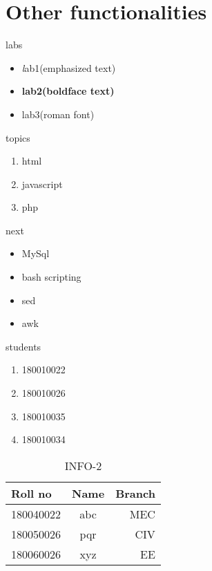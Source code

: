\documentclass{article}
\begin{document}
\section{Other functionalities}
{\large labs}
\begin{itemize}
\item \emph lab1(emphasized text)
\item \textbf {\tiny lab2(boldface text)}\\
\item \textrm {\Large lab3(roman font)}\\
\end{itemize}
{\large topics}
\begin{enumerate}
\item html
\item javascript
\item php
\end{enumerate}
{\large next}
\begin{itemize}
\item MySql
\item bash scripting
\item sed
\item awk
\end{itemize}
{\large students}
\begin{enumerate}
\item 180010022
\item 180010026
\item 180010035
\item 180010034
\end{enumerate}
\begin{table}
\caption{INFO-1}
\label{info-1} 
\end{table} 

\begin{table}
\begin{tabular}{|l|c|r|}\hline
Roll no & Name & Branch \\ \hline
180040022       & abc & MEC \\ \hline
180050026       & pqr & CIV \\ \hline
180060026       & xyz & EE \\ \hline
\end{tabular}
\caption{INFO-2}
\label{info-2} 
\end{table}
\end{document}

